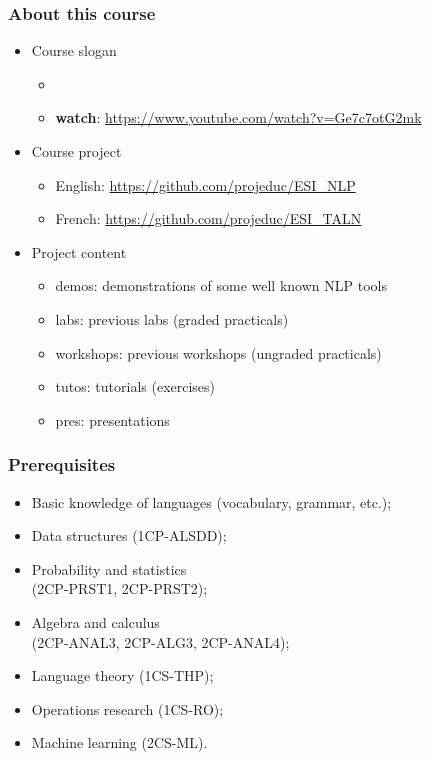\documentclass{beamer}
\subtitle[Presentation]{Course ``Curse" presentation}
\begin{document}
	
	
\begin{frame}
	\frametitle{About this course}
	
	\begin{itemize}
		\item Course slogan
		\begin{itemize}
			\item {}
			\item \textbf{watch}: \url{https://www.youtube.com/watch?v=Ge7c7otG2mk}
		\end{itemize}
		\item Course project
		\begin{itemize}
			\item English: \url{https://github.com/projeduc/ESI_NLP}
			\item French: \url{https://github.com/projeduc/ESI_TALN}
		\end{itemize}
		\item Project content
		\begin{itemize}
			\item demos: demonstrations of some well known NLP tools 
			\item labs: previous labs (graded practicals)
			\item workshops: previous workshops (ungraded practicals)
			\item tutos: tutorials (exercises) 
			\item pres: presentations
		\end{itemize}
	\end{itemize}
	
\end{frame}
 

\begin{frame}
\frametitle{Prerequisites}

\begin{itemize}
	\item Basic knowledge of languages (vocabulary, grammar, etc.);
	\item Data structures (1CP-ALSDD);
	\item Probability and statistics \\(2CP-PRST1, 2CP-PRST2);
	\item Algebra and calculus \\(2CP-ANAL3, 2CP-ALG3, 2CP-ANAL4);
	\item Language theory (1CS-THP);
	\item Operations research (1CS-RO);
	\item Machine learning (2CS-ML).
\end{itemize}

\end{frame}
\end{document}
